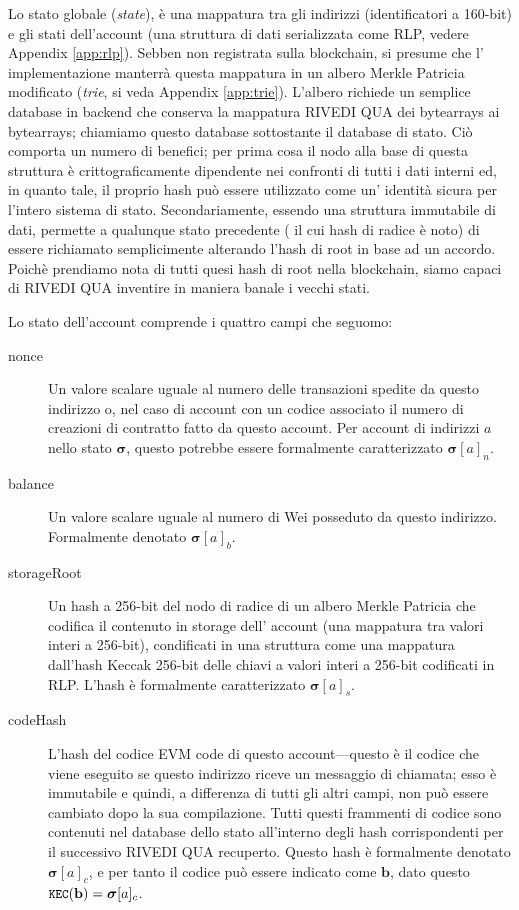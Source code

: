 \documentclass[9pt,oneside]{amsart}
\begin{document}
\begin{multicols}{2}
Lo stato globale (\textit{state}), è una mappatura tra gli indirizzi (identificatori a 160-bit) e gli stati dell'account (una struttura di dati serializzata come RLP, vedere Appendix \ref{app:rlp}). Sebben non registrata sulla blockchain, si presume che l' implementazione manterrà questa mappatura in un albero Merkle Patricia modificato (\textit{trie}, si veda Appendix \ref{app:trie}). L'albero richiede un semplice database in backend che conserva la mappatura RIVEDI QUA dei bytearrays ai bytearrays; chiamiamo questo database sottostante il database di stato. Ciò comporta un numero di benefici; per prima cosa il nodo alla base di questa struttura è crittograficamente dipendente nei confronti di tutti i dati interni ed, in quanto tale, il proprio hash può essere utilizzato come un' identità sicura per l'intero sistema di stato. Secondariamente, essendo una struttura immutabile di dati, permette a qualunque stato precedente ( il cui hash di radice è noto) di essere richiamato semplicimente alterando l'hash di root in base ad un accordo. Poichè prendiamo nota di tutti quesi hash di root nella blockchain, siamo capaci di RIVEDI QUA inventire in maniera banale i vecchi stati.

Lo stato dell'account comprende i quattro campi che seguomo:

\begin{description}
\item[nonce] Un valore scalare uguale al numero delle transazioni spedite da questo indirizzo o, nel caso di account con un codice associato il numero di creazioni di contratto fatto da questo account. Per account di indirizzi $a$ nello stato $\boldsymbol{\sigma}$, questo potrebbe essere formalmente caratterizzato $\boldsymbol{\sigma}[a]_n$.
\item[balance] Un valore scalare uguale al numero di Wei posseduto da questo indirizzo. Formalmente denotato $\boldsymbol{\sigma}[a]_b$.
\item[storageRoot] Un hash a  256-bit del nodo di radice di un albero Merkle Patricia che codifica il contenuto in storage dell' account (una mappatura tra valori interi a 256-bit), condificati in una struttura come una mappatura dall'hash Keccak 256-bit delle chiavi a valori interi a 256-bit codificati in RLP. L'hash è formalmente caratterizzato $\boldsymbol{\sigma}[a]_s$.
\item[codeHash] L'hash del codice EVM code di questo account---questo è il codice che viene eseguito se questo indirizzo riceve un messaggio di chiamata; esso è immutabile e quindi, a differenza di tutti gli altri campi, non può essere cambiato dopo la sua compilazione. Tutti questi frammenti di codice sono contenuti nel database dello stato all'interno degli hash corrispondenti per il successivo RIVEDI QUA recuperto. Questo hash è formalmente denotato $\boldsymbol{\sigma}[a]_c$, e per tanto il codice può essere indicato come $\mathbf{b}$, dato questo $\texttt{\small KEC}(\mathbf{b}) = \boldsymbol{\sigma}[a]_c$.
\end{description}


\end{multicols}
\end{document}
